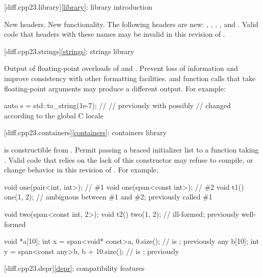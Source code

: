 [diff.cpp23.library]{\ref{library}: library introduction}

\change
New headers.
\rationale
New functionality.
\effect
The following \Cpp{} headers are new:
,
,
,
, and
.
Valid \CppXXIII{} code that  headers with these names may be
invalid in this revision of \Cpp{}.

[diff.cpp23.strings]{\ref{strings}: strings library}

\change
Output of floating-point overloads of  and .
\rationale
Prevent loss of information and improve consistency with other formatting
facilities.
\effect
{} and  function calls that take
floating-point arguments may produce a different output.
For example:
\begin{codeblock}
auto s = std::to_string(1e-7);  // 
                                // previously  with  possibly
                                // changed according to the global C locale
\end{codeblock}

[diff.cpp23.containers]{\ref{containers}: containers library}

\change
{} is constructible from .
\rationale
Permit passing a braced initializer list to a function taking .
\effect
Valid \CppXXIII{} code that relies on the lack of this constructor
may refuse to compile, or change behavior in this revision of \Cpp{}.
For example:
\begin{codeblock}
void one(pair<int, int>);       // \#1
void one(span<const int>);      // \#2
void t1() { one({1, 2}); }      // ambiguous between \#1 and \#2; previously called \#1

void two(span<const int, 2>);
void t2() { two({{1, 2}}); }    // ill-formed; previously well-formed

void *a[10];
int x = span<void* const>{a, 0}.size();     //  is ; previously 
any b[10];
int y = span<const any>{b, b + 10}.size();  //  is ; previously 
\end{codeblock}

[diff.cpp23.depr]{\ref{depr}: compatibility features}

